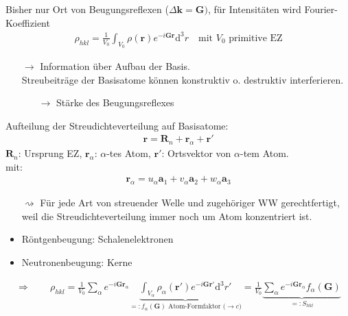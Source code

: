 \begin{itemize}
    Bisher nur Ort von Beugungsreflexen ($\Delta \textbf{k} = \textbf{G})$, für Intensitäten wird Fourier-Koeffizient
    \begin{align*}
        \rho_{hkl} = \frac{1}{V_0} \int_{V_0} \rho (\textbf{r}) e^{-i \textbf{G} \textbf{r}} \mathrm{d}^3r \quad \text{mit } V_0 \text{ primitive EZ}
    \end{align*}
    \begin{itemize}
        \item[$\rightarrow$] Information über Aufbau der Basis.\\
        Streubeiträge der Basisatome können konstruktiv o. destruktiv interferieren.
        \begin{itemize}
            \item[$\rightarrow$] Stärke des Beugungsreflexes
        \end{itemize}
    \end{itemize}
    Aufteilung der Streudichteverteilung auf Basisatome:
    \begin{align*}
        \textbf{r} = \textbf{R}_n + \textbf{r}_\alpha + \textbf{r}'
    \end{align*}
    $\textbf{R}_n$: Ursprung EZ, $\textbf{r}_\alpha$: $\alpha$-tes Atom, $\textbf{r}'$: Ortsvektor von $\alpha$-tem Atom.\\
    mit:
    \begin{align*}
        \textbf{r}_\alpha = u_\alpha \textbf{a}_1 + v_\alpha \textbf{a}_2 + w_\alpha \textbf{a}_3
    \end{align*}
    \begin{itemize}
        \item[$\rightsquigarrow$] Für jede Art von streuender Welle und zugehöriger WW gerechtfertigt, weil die Streudichteverteilung immer noch um Atom konzentriert ist.
    \end{itemize}
    \begin{itemize}
        \item Röntgenbeugung: Schalenelektronen
        \item Neutronenbeugung: Kerne
    \end{itemize}
    \begin{align*}
        \Rightarrow \qquad \rho_{hkl} = \frac{1}{V_0} \sum_{\alpha} e^{-i \textbf{G} \textbf{r}_{\alpha}} \underbrace{\int_{V_{\alpha}} \rho_{\alpha} (\textbf{r}') e^{-i \textbf{G} \textbf{r}'} \mathrm{d}^3r'}_{=: f_{\alpha} (\textbf{G})\text{ Atom-Formfaktor ($\rightarrow c$)}}  = \frac{1}{V_0} \underbrace{\sum_{\alpha} e^{-i \textbf{G} \textbf{r}_{\alpha}} f_{\alpha} (\textbf{G})}_{=: S_{hkl}}

\end{align*}
\end{itemize}

